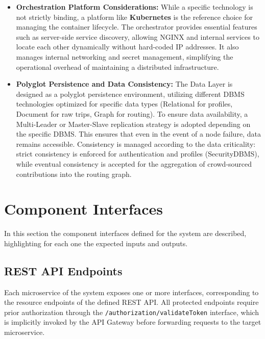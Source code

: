 \begin{itemize}
    \item \textbf{Orchestration Platform Considerations:} 
    While a specific technology is not strictly binding, a platform like \textbf{Kubernetes} is the reference choice for managing the container lifecycle. The orchestrator provides essential features such as server-side service discovery, allowing NGINX and internal services to locate each other dynamically without hard-coded IP addresses. It also manages internal networking and secret management, simplifying the operational overhead of maintaining a distributed infrastructure.

    \item \textbf{Polyglot Persistence and Data Consistency:} 
    The Data Layer is designed as a polyglot persistence environment, utilizing different DBMS technologies optimized for specific data types (Relational for profiles, Document for raw trips, Graph for routing). To ensure data availability, a Multi-Leader or Master-Slave replication strategy is adopted depending on the specific DBMS. This ensures that even in the event of a node failure, data remains accessible. Consistency is managed according to the data criticality: strict consistency is enforced for authentication and profiles (SecurityDBMS), while eventual consistency is accepted for the aggregation of crowd-sourced contributions into the routing graph.

\end{itemize}


\newpage

\section{Component Interfaces}
\label{sec:component_interfaces}

In this section the component interfaces defined for the system are described, highlighting for each one the expected inputs and outputs.

\subsection{REST API Endpoints}

Each microservice of the system exposes one or more interfaces, corresponding to the resource endpoints of the defined REST API. All protected endpoints require prior authorization through the \texttt{/authorization/validateToken} interface, which is implicitly invoked by the API Gateway before forwarding requests to the target microservice.

